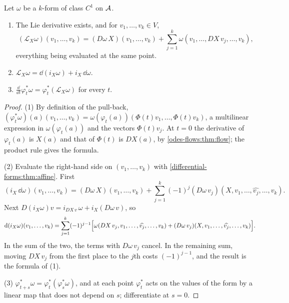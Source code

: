 \begin{notechapter}
\begin{theorem}\label{odes-flows:thm:cartan}
Let $\omega$ be a $k$-form of class $C^1$ on $\mathcal{A}$.
\begin{enumerate}[nosep]
  \item The Lie derivative exists, and for $v_1,\dots,v_k\in V$,
        \[
          (\mathcal L_X\omega)(v_1,\dots,v_k)
          = (D\omega\,X)(v_1,\dots,v_k)
          + \sum_{j=1}^k\omega(v_1,\dots,DX\,v_j,\dots,v_k) ,
        \]
        everything being evaluated at the same point.
  \item $\mathcal L_X\omega = \dd(i_X\omega) + i_X\,\dd\omega$.
  \item $\frac{\dd}{\dd t}\varphi_t^*\omega
        = \varphi_t^*(\mathcal L_X\omega)$ for every $t$.
\end{enumerate}
\end{theorem}

\begin{proof}
(1) By definition of the pull-back,
$(\varphi_t^*\omega)(a)(v_1,\dots,v_k)
= \omega(\varphi_t(a))(\Phi(t)v_1,\dots,\Phi(t)v_k)$, a multilinear
expression in $\omega(\varphi_t(a))$ and the vectors $\Phi(t)v_j$.
At $t = 0$ the derivative of $\varphi_t(a)$ is $X(a)$ and that of
$\Phi(t)$ is $DX(a)$, by \cref{odes-flows:thm:flow}; the product rule
gives the formula.

(2) Evaluate the right-hand side on $(v_1,\dots,v_k)$ with
\cref{differential-forms:thm:affine}. First
\[
  (i_X\,\dd\omega)(v_1,\dots,v_k)
  = (D\omega\,X)(v_1,\dots,v_k)
  + \sum_{j=1}^k(-1)^j(D\omega\,v_j)
    (X, v_1,\dots,\widehat{v_j},\dots,v_k) .
\]
Next $D(i_X\omega)v = i_{DX\,v}\,\omega + i_X(D\omega\,v)$, so
\[
  \mathrm{d}(i_X\omega)(v_1,\dots,v_k)
  = \sum_{j=1}^k(-1)^{j-1}\Bigl[
    \omega(DX\,v_j, v_1,\dots,\widehat{v_j},\dots,v_k)
    + (D\omega\,v_j)(X, v_1,\dots,\widehat{v_j},\dots,v_k)\Bigr] .
\]
In the sum of the two, the terms with $D\omega\,v_j$ cancel. In the
remaining sum, moving $DX\,v_j$ from the first place to the $j$th
costs $(-1)^{j-1}$, and the result is the formula of (1).

(3) $\varphi_{t+s}^*\omega = \varphi_t^*(\varphi_s^*\omega)$, and at
each point $\varphi_t^*$ acts on the values of the form by a linear
map that does not depend on $s$; differentiate at $s = 0$.
\end{proof}


\end{notechapter}
